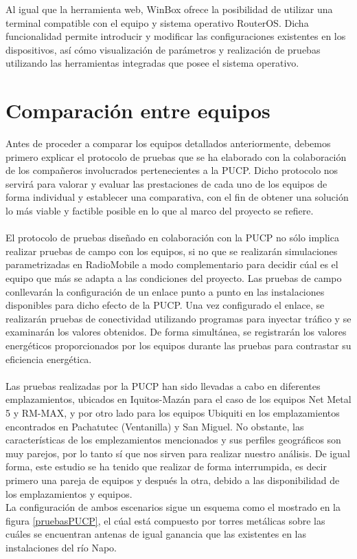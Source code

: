		Al igual que la herramienta web, WinBox ofrece la posibilidad de utilizar una terminal compatible con el equipo y sistema operativo RouterOS. Dicha funcionalidad permite introducir y modificar las configuraciones existentes en los dispositivos, así cómo visualización de parámetros y realización de pruebas utilizando las herramientas integradas que posee el sistema operativo.
		
\section{Comparación entre equipos}	
Antes de proceder a comparar los equipos detallados anteriormente, debemos primero explicar el protocolo de pruebas que se ha elaborado con la colaboración de los compañeros involucrados pertenecientes a la PUCP. Dicho protocolo nos servirá para valorar y evaluar las prestaciones de cada uno de los equipos de forma individual y establecer una comparativa, con el fin de obtener una solución lo más viable y factible posible en lo que al marco del proyecto se refiere. \\\\

 El protocolo de pruebas diseñado en colaboración con la PUCP no sólo implica realizar pruebas de campo con los equipos, si no que se realizarán simulaciones parametrizadas en RadioMobile a modo complementario para decidir cúal es el equipo que más se adapta a las condiciones del proyecto. Las pruebas de campo conllevarán la configuración de un enlace punto a punto en las instalaciones disponibles para dicho efecto de la PUCP. Una vez configurado el enlace, se realizarán pruebas de conectividad utilizando programas para inyectar tráfico y se examinarán los valores obtenidos. De forma simultánea, se registrarán los valores energéticos proporcionados por los equipos durante las pruebas para contrastar su eficiencia energética.\\\\
 
 Las pruebas realizadas por la PUCP han sido llevadas a cabo en diferentes emplazamientos, ubicados en Iquitos-Mazán para el caso de los equipos Net Metal 5 y RM-MAX, y por otro lado para los equipos Ubiquiti en los emplazamientos encontrados en Pachatutec (Ventanilla) y San Miguel. No obstante, las características de los emplezamientos mencionados y sus perfiles geográficos son muy parejos, por lo tanto sí que nos sirven para realizar nuestro análisis. De igual forma, este estudio se ha tenido que realizar de forma interrumpida, es decir primero una pareja de equipos y después la otra, debido a las disponibilidad de los emplazamientos y equipos.\\
 La configuración de ambos escenarios sigue un esquema como el mostrado en la figura \ref{pruebasPUCP}, el cúal está compuesto por torres metálicas sobre las cuáles se encuentran antenas de igual ganancia que las existentes en las instalaciones del río Napo.
 
